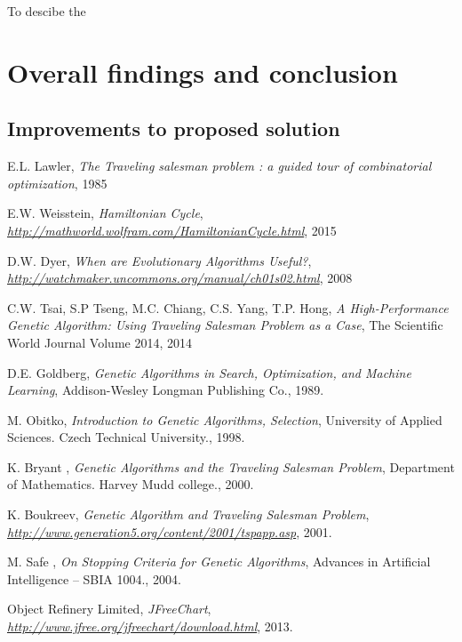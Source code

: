 \documentclass[article]{IEEEtran}
\begin{document}
To descibe the 

\section{Overall findings and conclusion}

\subsection{Improvements to proposed solution}

\begin{thebibliography}{9}

E.L. Lawler, \textit{The Traveling salesman problem : a guided tour of combinatorial optimization},
1985

E.W. Weisstein, \textit{Hamiltonian Cycle},
\textit{\url{http://mathworld.wolfram.com/HamiltonianCycle.html}}, 2015

D.W. Dyer, \textit{When are Evolutionary Algorithms Useful?},
\textit{\url{http://watchmaker.uncommons.org/manual/ch01s02.html}}, 2008

C.W. Tsai, S.P Tseng, M.C. Chiang, C.S. Yang, T.P. Hong, \textit{A High-Performance Genetic Algorithm: Using Traveling Salesman Problem as a Case},
The Scientific World Journal Volume 2014, 2014

D.E. Goldberg, \textit{Genetic Algorithms in Search, Optimization, and Machine Learning},
Addison-Wesley Longman Publishing Co., 1989. 

M. Obitko, \textit{Introduction to Genetic Algorithms, Selection},
University of Applied Sciences. Czech Technical University., 1998. 

K. Bryant , \textit{Genetic Algorithms and the Traveling Salesman Problem},
Department of Mathematics. Harvey Mudd college., 2000. 

K. Boukreev, \textit{Genetic Algorithm and Traveling Salesman Problem},
\textit{\url{http://www.generation5.org/content/2001/tspapp.asp}}, 2001.

M. Safe , \textit{On Stopping Criteria for Genetic Algorithms},
Advances in Artificial Intelligence – SBIA 1004., 2004. 

Object Refinery Limited, \textit{JFreeChart},
\textit{\url{http://www.jfree.org/jfreechart/download.html}}, 2013.

\end{thebibliography}
\end{document}
